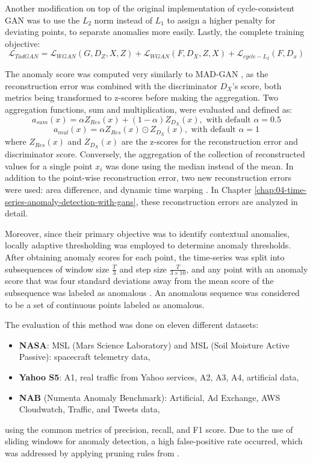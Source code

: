 Another modification on top of the original implementation of cycle-consistent GAN \cite{zhu2017cyclegan} was to use the $L_2$ norm instead of $L_1$ to assign a higher penalty for deviating points, to separate anomalies more easily. Lastly, the complete training objective:
$$
\mathcal{L}_{TadGAN} = \mathcal{L}_{WGAN}(G, D_Z, X, Z) + \mathcal{L}_{WGAN}(F, D_X, Z, X) + \mathcal{L}_{cycle-L_2} (F, D_x)
$$

The anomaly score was computed very similarly to MAD-GAN \cite{li2019madgan}, as the reconstruction error was combined with the discriminator $D_X$'s score, both metrics being transformed to z-scores before making the aggregation. Two aggregation functions, sum and multiplication, were evaluated and defined as:
$$
a_{sum}(x) = \alpha Z_{Res}(x) + (1-\alpha) Z_{D_X}(x), \text{ with default }\alpha = 0.5
$$
$$
a_{mul}(x) = \alpha Z_{Res}(x) \odot Z_{D_X}(x), \text{ with default } \alpha = 1
$$
where $Z_{Res}(x)$ and $Z_{D_X}(x)$ are the z-scores for the reconstruction error and discriminator score. Conversely, the aggregation of the collection of reconstructed values for a single point $x_i$ was done using the median instead of the mean. In addition to the point-wise reconstruction error, two new reconstruction errors were used: area difference, and dynamic time warping \cite{berndt1994dtw}. In Chapter \ref{chap:04-time-series-anomaly-detection-with-gans}, these reconstruction errors are analyzed in detail. 

Moreover, since their primary objective was to identify contextual anomalies, locally adaptive thresholding was employed to determine anomaly thresholds. After obtaining anomaly scores for each point, the time-series was split into subsequences of window size $\frac{T}{3}$ and step size $\frac{T}{3 \times 10}$, and any point with an anomaly score that was four standard deviations away from the mean score of the subsequence was labeled as anomalous \cite{geiger2020tadgan}. An anomalous sequence was considered to be a set of continuous points labeled as anomalous. 

The evaluation of this method was done on eleven different datasets:
\begin{itemize}
    \item \textbf{NASA}: MSL (Mars Science Laboratory) and MSL (Soil Moisture Active Passive): spacecraft telemetry data,
    \item \textbf{Yahoo S5}: A1, real traffic from Yahoo services, A2, A3, A4, artificial data,
    \item \textbf{NAB} (Numenta Anomaly Benchmark):  Artificial, Ad Exchange, AWS Cloudwatch, Traffic, and Tweets data,
\end{itemize}
using the common metrics of precision, recall, and F1 score. Due to the use of sliding windows for anomaly detection, a high false-positive rate occurred, which was addressed by applying pruning rules from \cite{hundman2018detecting}.

